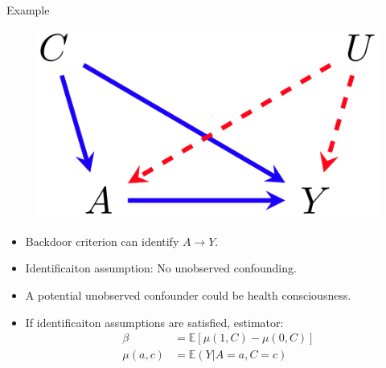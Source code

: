 \documentclass{beamer}
\begin{document}
\begin{frame}{Example}
	\begin{figure}
		\center
		\includegraphics[scale=0.2]{m1.png}
	\end{figure}
	\vspace{1em}
	\begin{itemize}
		\item Backdoor criterion can identify $ A \rightarrow Y $.
		\item Identificaiton assumption: No unobserved confounding.
		\item A potential unobserved confounder could be health consciousness.
		\item If identificaiton assumptions are satisfied, estimator:
		\begin{equation*}
				\begin{split}
					\beta &= \mathbb{E}[\mu(1, C) - \mu(0, C)] \\
					\mu(a, c) &= \mathbb{E}(Y | A=a, C=c)
				\end{split}
			\end{equation*}

	\end{itemize}
\end{frame}
\end{document}
